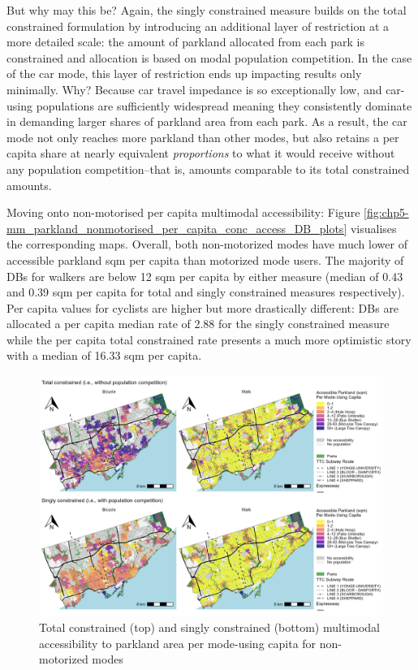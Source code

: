 \documentclass[
11pt, %
oneside, %
english, %
singlespacing, %
]{macthesis} %
\begin{document}
But why may this be? Again, the singly constrained measure builds on the total constrained formulation by introducing an additional layer of restriction at a more detailed scale: the amount of parkland allocated from each park is constrained and allocation is based on modal population competition. In the case of the car mode, this layer of restriction ends up impacting results only minimally. Why? Because car travel impedance is so exceptionally low, and car-using populations are sufficiently widespread meaning they consistently dominate in demanding larger shares of parkland area from each park. As a result, the car mode not only reaches more parkland than other modes, but also retains a per capita share at nearly equivalent \emph{proportions} to what it would receive without any population competition--that is, amounts comparable to its total constrained amounts.

Moving onto non-motorised per capita multimodal accessibility: Figure \ref{fig:chp5-mm_parkland_nonmotorised_per_capita_conc_access_DB_plots} visualises the corresponding maps. Overall, both non-motorized modes have much lower of accessible parkland sqm per capita than motorized mode users. The majority of DBs for walkers are below 12 sqm per capita by either measure (median of 0.43 and 0.39 sqm per capita for total and singly constrained measures respectively). Per capita values for cyclists are higher but more drastically different: DBs are allocated a per capita median rate of 2.88 for the singly constrained measure while the per capita total constrained rate presents a much more optimistic story with a median of 16.33 sqm per capita.

\begin{figure}

{\centering \includegraphics[width=6in]{./data/figures/chp5-mm_parkland_nonmotorised_per_capita_conc_access_DB_plots} 

}

\caption{\label{fig:chp5-mm_parkland_nonmotorised_per_capita_conc_access_DB_plots} Total constrained (top) and singly constrained (bottom) multimodal accessibility to parkland area per mode-using capita for non-motorized modes}\label{fig:unnamed-chunk-81}
\end{figure}
\end{document}
